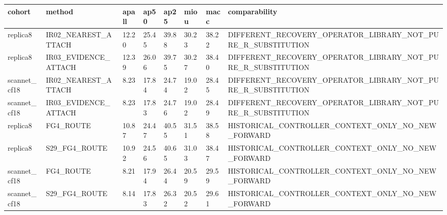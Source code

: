 \begin{tabular}{llllllll}
\toprule
cohort & method & apall & ap50 & ap25 & miou & macc & comparability \\
\midrule
replica8 & IR02\_NEAREST\_ATTACH & 12.20 & 25.45 & 39.88 & 30.23 & 38.22 & DIFFERENT\_RECOVERY\_OPERATOR\_LIBRARY\_NOT\_PURE\_R\_SUBSTITUTION \\
replica8 & IR03\_EVIDENCE\_ATTACH & 12.39 & 26.06 & 39.75 & 30.27 & 38.40 & DIFFERENT\_RECOVERY\_OPERATOR\_LIBRARY\_NOT\_PURE\_R\_SUBSTITUTION \\
scannet\_cf18 & IR02\_NEAREST\_ATTACH & 8.23 & 17.84 & 24.74 & 19.02 & 28.45 & DIFFERENT\_RECOVERY\_OPERATOR\_LIBRARY\_NOT\_PURE\_R\_SUBSTITUTION \\
scannet\_cf18 & IR03\_EVIDENCE\_ATTACH & 8.23 & 17.83 & 24.76 & 19.02 & 28.49 & DIFFERENT\_RECOVERY\_OPERATOR\_LIBRARY\_NOT\_PURE\_R\_SUBSTITUTION \\
replica8 & FG4\_ROUTE & 10.87 & 24.47 & 40.55 & 31.51 & 38.58 & HISTORICAL\_CONTROLLER\_CONTEXT\_ONLY\_NO\_NEW\_FORWARD \\
replica8 & S29\_FG4\_ROUTE & 10.92 & 24.56 & 40.65 & 31.03 & 38.47 & HISTORICAL\_CONTROLLER\_CONTEXT\_ONLY\_NO\_NEW\_FORWARD \\
scannet\_cf18 & FG4\_ROUTE & 8.21 & 17.94 & 26.44 & 20.59 & 29.59 & HISTORICAL\_CONTROLLER\_CONTEXT\_ONLY\_NO\_NEW\_FORWARD \\
scannet\_cf18 & S29\_FG4\_ROUTE & 8.14 & 17.83 & 26.32 & 20.52 & 29.61 & HISTORICAL\_CONTROLLER\_CONTEXT\_ONLY\_NO\_NEW\_FORWARD \\
\bottomrule
\end{tabular}

